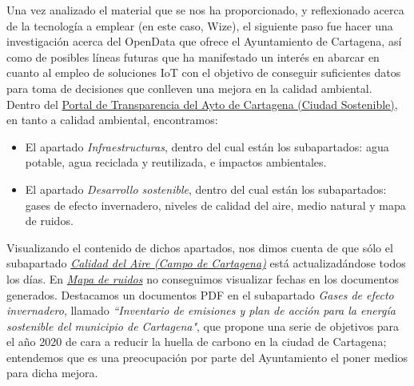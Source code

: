 \documentclass[12pt]{article}
\begin{document}
	Una vez analizado el material que se nos ha proporcionado, y reflexionado acerca de la tecnología a emplear (en este caso, Wize), el siguiente paso fue hacer una investigación acerca del OpenData que ofrece el Ayuntamiento de Cartagena, así como de posibles líneas futuras que ha manifestado un interés en abarcar en cuanto al empleo de soluciones IoT con el objetivo de conseguir suficientes datos para toma de decisiones que conlleven una mejora en la calidad ambiental. \\
	
	Dentro del 		\href{https://www.cartagena.es/plantillas/14b.asp?pt_idpag=1431}{Portal de Transparencia del Ayto de Cartagena (Ciudad Sostenible)}, en tanto a calidad ambiental, encontramos:
	
		\begin{itemize}
		\item El apartado \textit{Infraestructuras}, dentro del cual están los subapartados: agua potable, agua reciclada y reutilizada, e impactos ambientales.
		\item El apartado \textit{Desarrollo sostenible}, dentro del cual están los subapartados: gases de efecto invernadero, niveles de calidad del aire, medio natural y mapa de ruidos.
	\end{itemize} 
	
	Visualizando el contenido de dichos apartados, nos dimos cuenta de que sólo el subapartado 	\href{https://www.cartagena.es/calidad_aire.asp}{\textit{Calidad del Aire (Campo de Cartagena)}} está actualizadándose todos los días. En \href{https://urbanismo.cartagena.es/PortalUrbanismo/Paginas/65 en urbanismo no tienen informes ambientales}{\textit{Mapa de ruidos}} no conseguimos visualizar fechas en los documentos generados. Destacamos un documentos PDF en el subapartado \textit{Gases de efecto invernadero}, llamado  \textit{``Inventario de emisiones y plan de acción para la energía sostenible del municipio de Cartagena"}, que propone una serie de objetivos para el año 2020 de cara a reducir la huella de carbono en la ciudad de Cartagena; entendemos que es una preocupación por parte del Ayuntamiento el poner medios para dicha mejora. \\
	
	
\end{document}
